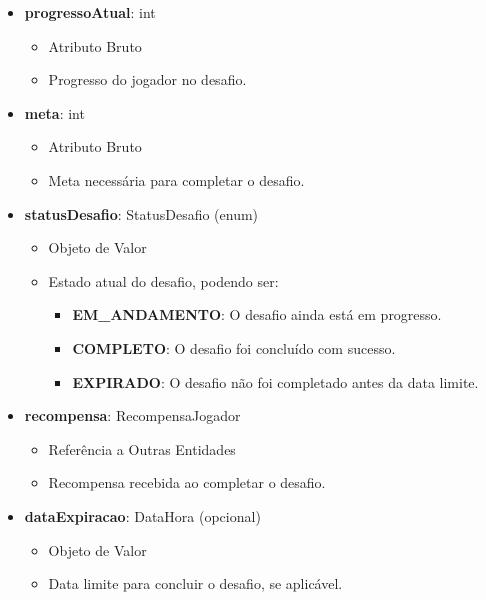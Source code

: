 \begin{itemize}
        \item \textbf{progressoAtual}: int  
              \begin{itemize}
                  \item Atributo Bruto
                  \item Progresso do jogador no desafio.
              \end{itemize}
    
        \item \textbf{meta}: int  
              \begin{itemize}
                  \item Atributo Bruto
                  \item Meta necessária para completar o desafio.
              \end{itemize}
    
        \item \textbf{statusDesafio}: StatusDesafio (enum)  
              \begin{itemize}
                  \item Objeto de Valor
                  \item Estado atual do desafio, podendo ser:
                  \begin{itemize}
                      \item \textbf{EM\_ANDAMENTO}: O desafio ainda está em progresso.
                      \item \textbf{COMPLETO}: O desafio foi concluído com sucesso.
                      \item \textbf{EXPIRADO}: O desafio não foi completado antes da data limite.
                  \end{itemize}
              \end{itemize}
    
        \item \textbf{recompensa}: RecompensaJogador  
              \begin{itemize}
                  \item Referência a Outras Entidades
                  \item Recompensa recebida ao completar o desafio.
              \end{itemize}
    
        \item \textbf{dataExpiracao}: DataHora (opcional)  
              \begin{itemize}
                  \item Objeto de Valor
                  \item Data limite para concluir o desafio, se aplicável.
              \end{itemize}
    \end{itemize}

